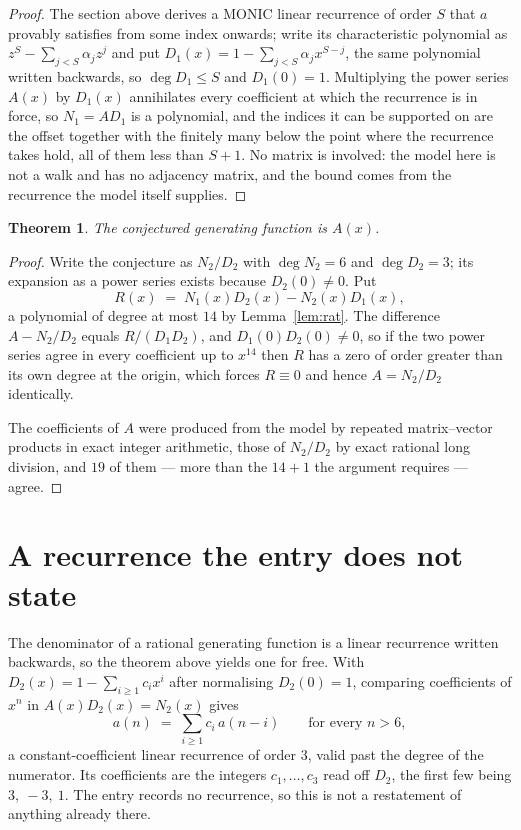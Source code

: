 \documentclass[11pt,a4paper]{article}
\theoremstyle{plain}
\newtheorem{theorem}{Theorem}
\theoremstyle{definition}
\begin{document}
\begin{proof}
The section above derives a MONIC linear recurrence of order $S$ that $a$ provably satisfies
from some index onwards; write its characteristic polynomial as $z^S-\sum_{j<S}\alpha_jz^j$
and put $D_1(x)=1-\sum_{j<S}\alpha_jx^{S-j}$, the same polynomial written backwards, so
$\deg D_1\le S$ and $D_1(0)=1$. Multiplying the power series $A(x)$ by $D_1(x)$ annihilates
every coefficient at which the recurrence is in force, so $N_1=AD_1$ is a polynomial, and the
indices it can be supported on are the offset together with the finitely many below the point
where the recurrence takes hold, all of them less than $S+1$. No matrix is involved: the
model here is not a walk and has no adjacency matrix, and the bound comes from the recurrence
the model itself supplies.
\end{proof}

\begin{theorem}
The conjectured generating function is $A(x)$.
\end{theorem}

\begin{proof}
Write the conjecture as $N_2/D_2$ with $\deg N_2=6$ and $\deg D_2=3$; its expansion as a
power series exists because $D_2(0)\neq0$. Put
\[
R(x)\;=\;N_1(x)D_2(x)-N_2(x)D_1(x),
\]
a polynomial of degree at most $14$ by Lemma~\ref{lem:rat}. The difference
$A-N_2/D_2$ equals $R/(D_1D_2)$, and $D_1(0)D_2(0)\neq0$, so if the two power series agree in
every coefficient up to $x^{14}$ then $R$ has a zero of order greater than its own
degree at the origin, which forces $R\equiv0$ and hence $A=N_2/D_2$ identically.

The coefficients of $A$ were produced from the model by repeated matrix--vector products in
exact integer arithmetic, those of $N_2/D_2$ by exact rational long division, and $19$
of them --- more than the $14+1$ the argument requires --- agree.
\end{proof}

\section{A recurrence the entry does not state}

The denominator of a rational generating function is a linear recurrence written backwards, so
the theorem above yields one for free. With $D_2(x)=1-\sum_{i\ge1}c_ix^i$ after normalising
$D_2(0)=1$, comparing coefficients of $x^n$ in $A(x)D_2(x)=N_2(x)$ gives
\[
a(n)\;=\;\sum_{i\ge1}c_i\,a(n-i)\qquad\text{for every }n>6,
\]
a constant-coefficient linear recurrence of order $3$, valid past the degree of the
numerator. Its coefficients are the integers $c_1,\dots,c_{3}$ read off $D_2$, the first few being $3,\ -3,\ 1$. The entry records no recurrence, so this is not a restatement of anything
already there.
\end{document}
